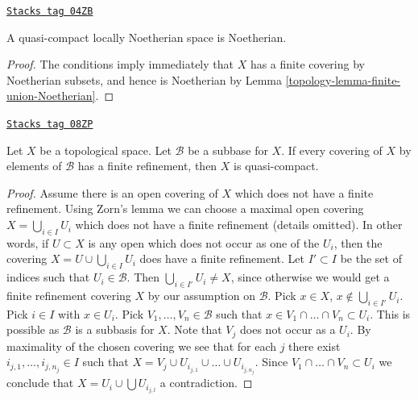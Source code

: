 \begin{lemma}
\label{topology-lemma-quasi-compact-locally-Noetherian-Noetherian}
\href{https://stacks.math.columbia.edu/tag/04ZB}{\texttt{Stacks tag 04ZB}}

A quasi-compact locally Noetherian space is Noetherian.
\end{lemma}

\begin{proof}

The conditions imply immediately that $X$ has a finite covering by
Noetherian subsets, and hence is Noetherian by
Lemma \ref{topology-lemma-finite-union-Noetherian}.
\end{proof}

\begin{lemma}

\label{topology-lemma-subbase-theorem}
\href{https://stacks.math.columbia.edu/tag/08ZP}{\texttt{Stacks tag 08ZP}}

Let $X$ be a topological space. Let $\mathcal{B}$ be a subbase for $X$.
If every covering of $X$ by elements of $\mathcal{B}$ has a finite
refinement, then $X$ is quasi-compact.
\end{lemma}

\begin{proof}
Assume there is an open covering of $X$ which does not have a finite
refinement. Using Zorn's lemma we can choose a maximal open covering
$X = \bigcup_{i \in I} U_i$ which does not have a finite refinement
(details omitted).
In other words, if $U \subset X$ is any open which does not occur as
one of the $U_i$, then the covering $X = U \cup \bigcup_{i \in I} U_i$
does have a finite refinement. Let $I' \subset I$ be the set of indices
such that $U_i \in \mathcal{B}$. Then $\bigcup_{i \in I'} U_i \not = X$,
since otherwise we would get a finite refinement covering $X$ by our
assumption on $\mathcal{B}$. Pick $x \in X$,
$x \not \in \bigcup_{i \in I'} U_i$. Pick $i \in I$ with $x \in U_i$.
Pick $V_1, \ldots, V_n \in \mathcal{B}$ such that
$x \in V_1 \cap \ldots \cap V_n \subset U_i$. This is
possible as $\mathcal{B}$ is a subbasis for $X$. Note that
$V_j$ does not occur as a $U_i$. By maximality of the chosen
covering we see that for each $j$ there exist
$i_{j, 1}, \ldots, i_{j, n_j} \in I$ such that
$X = V_j \cup U_{i_{j, 1}} \cup \ldots \cup U_{i_{j, n_j}}$.
Since $V_1 \cap \ldots \cap V_n \subset U_i$ we conclude that
$X = U_i \cup \bigcup U_{i_{j, l}}$ a contradiction.
\end{proof}

